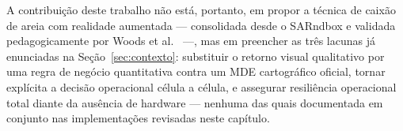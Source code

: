 A contribuição deste trabalho não está, portanto, em propor a técnica
de caixão de areia com realidade aumentada — consolidada desde o
SARndbox e validada pedagogicamente por Woods et al.~ —,
mas em preencher as três lacunas já enunciadas na
Seção~\ref{sec:contexto}: substituir o retorno visual qualitativo por
uma regra de negócio quantitativa contra um MDE cartográfico oficial,
tornar explícita a decisão operacional célula a célula, e assegurar
resiliência operacional total diante da ausência de hardware — nenhuma
das quais documentada em conjunto nas implementações revisadas neste
capítulo.
